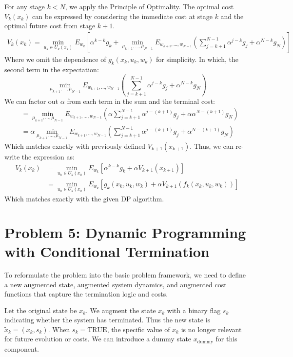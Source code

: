 \documentclass[11pt, a4paper, oneside]{memoir}
\begin{document}
For any stage $k < N$, we apply the Principle of Optimality. The optimal cost $V_k(x_k)$ can be expressed by considering the immediate cost at stage $k$ and the optimal future cost from stage $k+1$.
\begin{align*}
  V_k(x_k) = \min_{u_k \in U_k(x_k)} E_{w_k} \left[ \alpha^{k-k} g_k + \min_{\mu_{k+1}, \dots, \mu_{N-1}} E_{w_{k+1}, \dots, w_{N-1}} \left( \sum_{j=k+1}^{N-1} \alpha^{j-k} g_j + \alpha^{N-k} g_N \right) \right]
\end{align*}
Where we omit the dependence of $g_k(x_k, u_k, w_k)$ for simplicity. In which, the second term in the expectation:
\[ \min_{\mu_{k+1}, \dots, \mu_{N-1}} E_{w_{k+1}, \dots, w_{N-1}} \left( \sum_{j=k+1}^{N-1} \alpha^{j-k} g_j + \alpha^{N-k} g_N \right) \]
We can factor out $\alpha$ from each term in the sum and the terminal cost:
\begin{align*}
  &= \min_{\mu_{k+1}, \dots, \mu_{N-1}} E_{w_{k+1}, \dots, w_{N-1}} \left( \alpha \sum_{j=k+1}^{N-1} \alpha^{j-(k+1)} g_j + \alpha \alpha^{N-(k+1)} g_N \right) \\
  &= \alpha \min_{\mu_{k+1}, \dots, \mu_{N-1}} E_{w_{k+1}, \dots, w_{N-1}} \left( \sum_{j=k+1}^{N-1} \alpha^{j-(k+1)} g_j + \alpha^{N-(k+1)} g_N \right)
\end{align*}
Which matches exactly with previously defined $V_{k+1}(x_{k+1})$.
Thus, we can re-write the expression as:
\begin{align*}
  V_k(x_k) &= \min_{u_k \in U_k(x_k)} E_{w_k} \left[ \alpha^{k-k} g_k + \alpha V_{k+1}(x_{k+1}) \right] \\
  &= \min_{u_k \in U_k(x_k)} E_{w_k} \left[ g_k(x_k, u_k, w_k) + \alpha V_{k+1}(f_k(x_k, u_k, w_k)) \right]
\end{align*}
Which matches exactly with the given DP algorithm.

\chapter{Problem 5: Dynamic Programming with Conditional Termination}
To reformulate the problem into the basic problem framework,
we need to define a new augmented state, augmented system dynamics,
and augmented cost functions that capture the termination logic and costs.

Let the original state be $x_k$. We augment the state $x_k$ with a binary flag $s_k$ indicating whether the system has terminated.
Thus the new state is $\tilde{x}_k = (x_k, s_k)$.
When $s_k = \text{TRUE}$, the specific value of $x_k$ is no longer relevant for future evolution or costs.
We can introduce a dummy state $x_{\text{dummy}}$ for this component.
\end{document}
